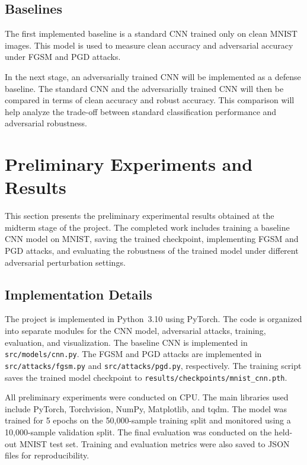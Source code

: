 \documentclass[conference,10pt]{IEEEtran}
\begin{document}
\subsection{Baselines}

The first implemented baseline is a standard CNN trained only on clean MNIST images. This model is used to measure clean accuracy and adversarial accuracy under FGSM and PGD attacks.

In the next stage, an adversarially trained CNN will be implemented as a defense baseline. The standard CNN and the adversarially trained CNN will then be compared in terms of clean accuracy and robust accuracy. This comparison will help analyze the trade-off between standard classification performance and adversarial robustness.
\section{Preliminary Experiments and Results}

This section presents the preliminary experimental results obtained at the midterm stage of the project. The completed work includes training a baseline CNN model on MNIST, saving the trained checkpoint, implementing FGSM and PGD attacks, and evaluating the robustness of the trained model under different adversarial perturbation settings.

\subsection{Implementation Details}

The project is implemented in Python~3.10 using PyTorch. The code is organized into separate modules for the CNN model, adversarial attacks, training, evaluation, and visualization. The baseline CNN is implemented in \texttt{src/models/cnn.py}. The FGSM and PGD attacks are implemented in \texttt{src/attacks/fgsm.py} and \texttt{src/attacks/pgd.py}, respectively. The training script saves the trained model checkpoint to \texttt{results/checkpoints/mnist\_cnn.pth}.

All preliminary experiments were conducted on CPU. The main libraries used include PyTorch, Torchvision, NumPy, Matplotlib, and tqdm. The model was trained for 5 epochs on the 50,000-sample training split and monitored using a 10,000-sample validation split. The final evaluation was conducted on the held-out MNIST test set. Training and evaluation metrics were also saved to JSON files for reproducibility.
\end{document}
